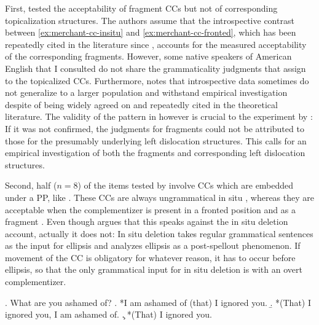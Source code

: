 First, \citet{merchant.etal2013} tested the acceptability of fragment CCs but not of corresponding topicalization structures. The authors assume that the introspective contrast between \ref{ex:merchant-cc-insitu} and \ref{ex:merchant-cc-fronted}, which has been repeatedly cited in the literature since \citet{stowell1981}, accounts for the measured acceptability of the corresponding fragments. However, some native speakers of American English that I consulted do not share the grammaticality judgments that \citet{merchant.etal2013} assign to the topicalized CCs. Furthermore, \citet{featherston2007} notes that introspective data sometimes do not generalize to a larger population and withstand empirical investigation despite of being widely agreed on and repeatedly cited in the theoretical literature. The validity of the pattern in \LLast however is crucial to the experiment by \citet{merchant.etal2013}: If it was not confirmed, the judgments for fragments could not be attributed to those for the presumably underlying left dislocation structures. This calls for an empirical investigation of both the fragments and corresponding left dislocation structures.

Second, half ($n = 8$) of the items tested by \citet{merchant.etal2013} involve CCs which are embedded under a PP, like \Next. These CCs are always ungrammatical in situ \Next[a], whereas they are acceptable when the complementizer is present in a fronted position \Next[b] and as a fragment \Next[c]. Even though \citet{merchant2004} argues that this speaks against the in situ deletion account, actually it does not: In situ deletion takes regular grammatical sentences as the input for ellipsis and analyzes ellipsis as a post-spellout phenomenon. If movement of the CC is obligatory for whatever reason, it has to occur before ellipsis, so that the only grammatical input for in situ deletion is \Next[b] with an overt complementizer.

\ex. What are you ashamed of?
\a. *I am ashamed of (that) I ignored you.
\b. *(That) I ignored you, I am ashamed of.
\c. *(That) I ignored you.

